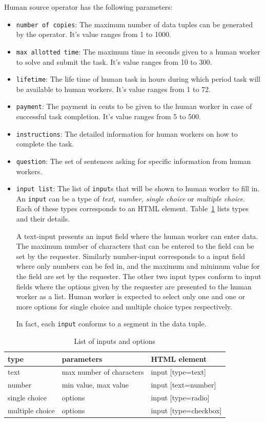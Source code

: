Human source operator has the following parameters:
\begin{itemize}
	\item \texttt{number of copies}: The maximum number of data tuples can be 
	generated by the operator. It's value ranges from 1 to 1000.
	\item \texttt{max allotted time}: The maximum time in seconds given to a human 
	worker to solve and submit the task. It's value ranges from 10 to 300.
	\item \texttt{lifetime}: The life time of human task in hours during which period 
	task will be available to human workers. It's value ranges from 1 to 72.
	\item \texttt{payment}: The payment in cents to be given to the human worker in 
	case of successful task completion. It's value ranges from 5 to 500.
	\item \texttt{instructions}: The detailed information for human workers on how to 
	complete the task.
	\item \texttt{question}: The set of sentences asking for specific information from 
	human workers.
	\item \texttt{input list}: The list of \texttt{input}s that will be shown to human worker 
	to fill in. An \texttt{input} can be a type of \textit{text, number, single choice} or 
	\textit{multiple choice}. Each of these types corresponds to an HTML element. 
	Table~\ref{tab:input list} lists types and their details.
	
	A text-input presents an input field where the human worker can 
	enter data. The maximum number of characters that can be entered to the field can be 
	set by the requester. Similarly number-input corresponds to a input field where only 
	numbers can be fed in, and the maximum and minimum value for the field are set by 
	the requester. The other two input types conform to input fields where the options given 
	by the requester are presented to the human worker as a list. Human worker is expected 
	to select only one and one or more options for single choice and multiple choice types 
	respectively.
	
	In fact, each \texttt{input} conforms to a segment in the data tuple.
\end{itemize}

\begin{table}[ht]
	\centering
	\caption{List of inputs and options}
	\label{tab:input list}
	\begin{tabular}{| l | l | l |}
		\hline
		type & parameters & HTML element \\ \hline
		text & max number of characters & input [type=text] \\ \hline
		number & min value, max value & input [text=number] \\ \hline
		single choice & options & input [type=radio] \\ \hline
		multiple choice & options & input [type=checkbox] \\ \hline
	\end{tabular}
\end{table} 


